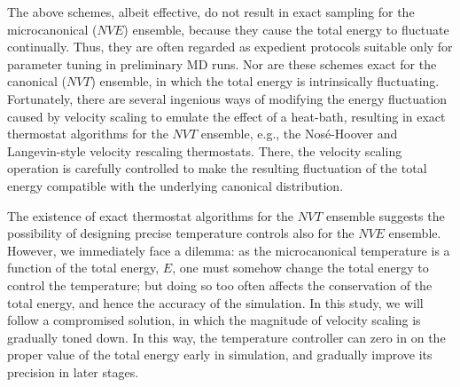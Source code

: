 \documentclass[reprint]{revtex4-1}
\begin{document}
The above schemes, albeit effective,
do not result in exact sampling for the microcanonical ($NVE$) ensemble\cite{hermansson1988},
because they cause the total energy to fluctuate continually.
%
Thus, they are often regarded as expedient protocols
suitable only for parameter tuning in preliminary MD runs.
%
Nor are these schemes exact for the canonical ($NVT$) ensemble,
in which the total energy is intrinsically fluctuating.
%
Fortunately, there are several ingenious ways
of modifying the energy fluctuation caused by velocity scaling
to emulate the effect of a heat-bath,
resulting in exact thermostat algorithms for the $NVT$ ensemble,
e.g., the Nos\'e-Hoover\cite{nose1984, nose1984mp, hoover1985, martyna1992}
and Langevin-style velocity rescaling\cite{bussi2007} thermostats.
%
There,
the velocity scaling operation is carefully
controlled to make
the resulting fluctuation of the total energy
compatible with the underlying canonical distribution.


The existence of exact thermostat algorithms for the $NVT$ ensemble
suggests the possibility of designing
precise temperature controls also
for the $NVE$ ensemble.
%
However, we immediately face a dilemma:
%
as the microcanonical temperature is a function of the total energy, $E$,
one must somehow change the total energy to control the temperature;
%
but doing so too often affects the conservation of the total energy,
and hence the accuracy of the simulation\cite{hermansson1988}.
%
In this study, we will follow a compromised solution,
in which the magnitude of velocity scaling is gradually toned down.
%
In this way,
the temperature controller can
zero in on
the proper value of the total energy
early in simulation,
and gradually improve its precision
in later stages.
\end{document}
